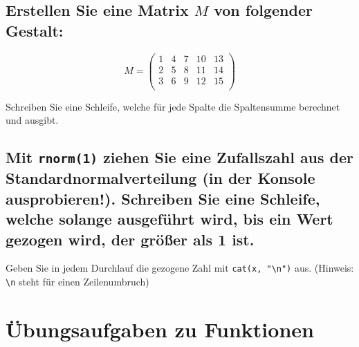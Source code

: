 \documentclass[12pt,a4paper]{article}
\begin{document}
\hypertarget{erstellen-sie-eine-matrix-m-von-folgender-gestalt}{%
\subsection{\texorpdfstring{Erstellen Sie eine Matrix \(M\) von
folgender
Gestalt:}{Erstellen Sie eine Matrix M von folgender Gestalt:}}\label{erstellen-sie-eine-matrix-m-von-folgender-gestalt}}

\[
M=\begin{pmatrix}
1 & 4 & 7 & 10 & 13\\
2 & 5 & 8 & 11 & 14\\
3 & 6 & 9 & 12 & 15\\
\end{pmatrix}
\]

Schreiben Sie eine Schleife, welche für jede Spalte die Spaltensumme
berechnet und ausgibt.

\hypertarget{mit-ziehen-sie-eine-zufallszahl-aus-der-standardnormalverteilung-in-der-konsole-ausprobieren.-schreiben-sie-eine-schleife-welche-solange-ausgefuxfchrt-wird-bis-ein-wert-gezogen-wird-der-gruxf6uxdfer-als-1-ist.}{%
\subsection{\texorpdfstring{Mit \texttt{rnorm(1)} ziehen Sie eine
Zufallszahl aus der Standardnormalverteilung (in der Konsole
ausprobieren!). Schreiben Sie eine Schleife, welche solange ausgeführt
wird, bis ein Wert gezogen wird, der größer als 1
ist.}{Mit  ziehen Sie eine Zufallszahl aus der Standardnormalverteilung (in der Konsole ausprobieren!). Schreiben Sie eine Schleife, welche solange ausgeführt wird, bis ein Wert gezogen wird, der größer als 1 ist.}}\label{mit-ziehen-sie-eine-zufallszahl-aus-der-standardnormalverteilung-in-der-konsole-ausprobieren.-schreiben-sie-eine-schleife-welche-solange-ausgefuxfchrt-wird-bis-ein-wert-gezogen-wird-der-gruxf6uxdfer-als-1-ist.}}

Geben Sie in jedem Durchlauf die gezogene Zahl mit
\texttt{cat(x,\ "\textbackslash{}n")} aus. (Hinweis:
\texttt{\textbackslash{}n} steht für einen Zeilenumbruch)

\hypertarget{uxfcbungsaufgaben-zu-funktionen}{%
\section{Übungsaufgaben zu
Funktionen}\label{uxfcbungsaufgaben-zu-funktionen}}
\end{document}
